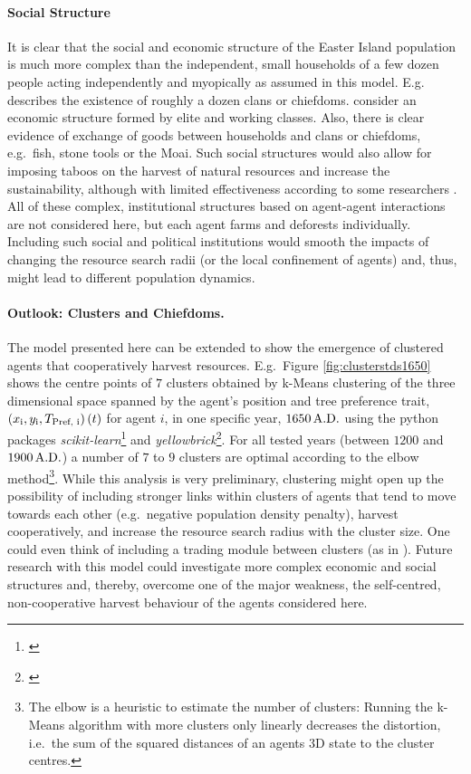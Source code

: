 \paragraph{Social Structure}
It is clear that the social and economic structure of the Easter Island population is much more complex than the independent, small households of a few dozen people acting independently and myopically as assumed in this model. 
E.g.\ \citet{Diamond2011} describes the existence of roughly a dozen clans or chiefdoms. \citet{Puleston2017} consider an economic structure formed by elite and working classes.
Also, there is clear evidence of exchange of goods between households and clans or chiefdoms, e.g.\ fish, stone tools or the Moai.
Such social structures would also allow for imposing taboos on the harvest of natural resources and increase the sustainability, although with limited effectiveness according to some researchers \citep{Good2006}. 
All of these complex, institutional structures based on agent-agent interactions are not considered here, but each agent farms and deforests individually.
Including such social and political institutions would smooth the impacts of changing the resource search radii (or the local confinement of agents) and, thus, might lead to different population dynamics.

\paragraph{Outlook: Clusters and Chiefdoms.}
The model presented here can be extended to show the emergence of clustered agents that cooperatively harvest resources.
E.g.\ Figure \ref{fig:clusterstds1650} shows the centre points of $7$ clusters obtained by k-Means clustering of the three dimensional space spanned by the agent's position and tree preference trait, $\left( x_{\rm i}, y_{\rm i}, T_\text{Pref, i} \right)(t)$ for agent $i$, in one specific year, $1650\, {\rm A.D.}$ using the python packages \textit{scikit-learn}\footnote{\citet{scikit-learn}} and \textit{yellowbrick}\footnote{\citet{yellowbrick}}.
For all tested years (between $1200$ and $1900\, {\rm A.D.}$) a number of $7$ to $9$ clusters are optimal according to the elbow method\footnote{The elbow is a heuristic to estimate the number of clusters:
	Running the k-Means algorithm with more clusters only linearly decreases the distortion, i.e.\ the sum of the squared distances of an agents 3D state to the cluster centres.}.
While this analysis is very preliminary, clustering might open up the possibility of including stronger links within clusters of agents that tend to move towards each other (e.g.\ negative population density penalty), harvest cooperatively, and increase the resource search radius with the cluster size.
One could even think of including a trading module between clusters (as in ).
Future research with this model could investigate more complex economic and social structures and, thereby, overcome one of the major weakness, the self-centred, non-cooperative harvest behaviour of the agents considered here.

